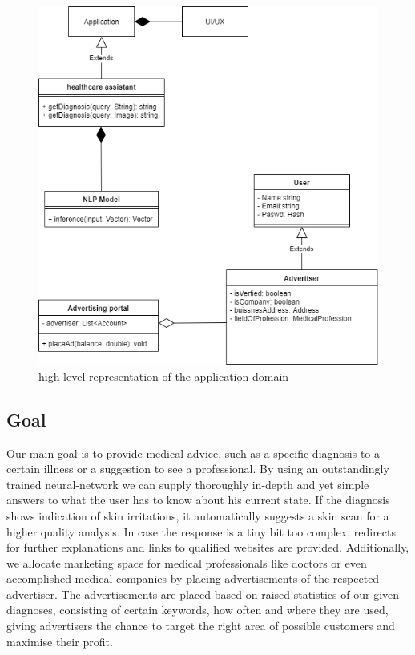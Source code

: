 \documentclass[12pt]{article}
\theoremstyle{definition}
\begin{document}
\begin{figure}[H]
    \centering
    \includegraphics[scale=0.6]{SystemSpec/Usecases/Diagrams/DoctorRobert-ClassDiagram.png}
    \caption{high-level representation of the application domain}
    \label{fig:my_label}
\end{figure}

\pagebreak

\subsection{Goal}

Our main goal is to provide medical advice, such as a specific diagnosis to a certain illness or a suggestion to see a professional. By using an outstandingly trained neural-network we can supply thoroughly in-depth and yet simple answers to what the user has to know about his current state. If the diagnosis shows indication of skin irritations, it automatically suggests a skin scan for a higher quality analysis. In case the response is a tiny bit too complex, redirects for further explanations and links to qualified websites are provided.
Additionally, we allocate marketing space for medical professionals like doctors or even accomplished medical companies by placing advertisements of the respected advertiser. The advertisements are placed based on raised statistics of our given diagnoses, consisting of certain keywords, how often and where they are used, giving advertisers the chance to target the right area of possible customers and maximise their profit.
\end{document}
